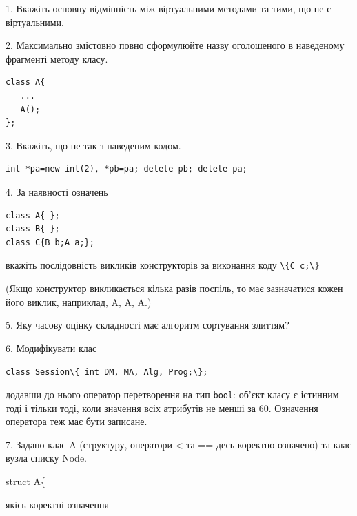 \documentclass[12pt, ukrainian]{article}
\def\code#1{\Verb!#1!}
\begin{document}
{%
1. Вкажіть основну відмінність між віртуальними методами та тими, що не є віртуальними.%
\par
\vspace{2mm}
2. Максимально змістовно повно сформулюйте назву оголошеного в наведеному фрагменті методу класу.
\vspace{-3mm}
\begin{verbatim}class A{
   ...
   A();
};\end{verbatim}
\vspace{-3mm}
\par
\vspace{2mm}
3. Вкажіть, що не так з наведеним кодом.
\vspace{-3mm}
\begin{verbatim}int *pa=new int(2), *pb=pa; delete pb; delete pa;\end{verbatim}
\vspace{-3mm}
\par
\vspace{2mm}
4. За наявності означень
\vspace{-3mm}
\begin{verbatim}
class A{ };
class B{ };
class C{B b;A a;};\end{verbatim}
\vspace{-3mm}
вкажіть послідовність викликів конструкторів за виконання коду \code{\{C c;\}} 

(Якщо конструктор викликається кілька разів поспіль, то має зазначатися кожен його виклик, наприклад, A, A, A.)

\vspace{2mm}
5. Яку часову оцінку складності має алгоритм сортування злиттям?
\par
\vspace{2mm}
6. Модифікувати клас 

\qquad\code{class Session\{ int DM, MA, Alg, Prog;\};} 


додавши до нього оператор перетворення на тип \code{bool}: об'єкт класу є істинним тоді і тільки тоді, коли значення всіх атрибутів не менші за 60. Означення оператора теж має бути записане.%
\par
\vspace{2mm}
7. 
Задано клас A (структуру, оператори < та == десь коректно означено) та клас вузла списку Node.

struct A\{

\quad  якісь коректні означення 

}
\end{document}
